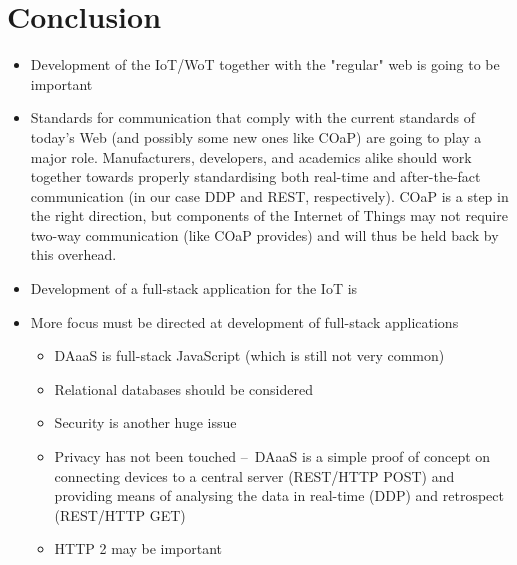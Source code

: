 \section{Conclusion}
\begin{itemize}
  \item Development of the IoT/WoT together with the "regular" web is going to be important
  \item Standards for communication that comply with the current standards of today's Web (and possibly some new ones like COaP) are going to play a major role. Manufacturers, developers, and academics alike should work together towards properly standardising both real-time and after-the-fact communication (in our case DDP and REST, respectively). COaP is a step in the right direction, but components of the Internet of Things may not require two-way communication (like COaP provides) and will thus be held back by this overhead.
  \item Development of a full-stack application for the IoT is 
  \item More focus must be directed at development of full-stack applications
  \begin{itemize}
      \item DAaaS is full-stack JavaScript (which is still not very common)
      \item Relational databases should be considered
      \item Security is another huge issue
      \item Privacy has not been touched – DAaaS is a simple proof of concept on connecting devices to a central server (REST/HTTP POST) and providing means of analysing the data in real-time (DDP) and retrospect (REST/HTTP GET)
      \item HTTP 2 may be important
  \end{itemize}

\end{itemize}

    